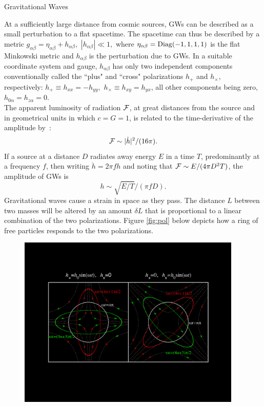 {Gravitational Waves}
{At a sufficiently large distance from cosmic sources, GWs 
can be described as a small perturbation to a flat spacetime. 
The spacetime can thus be described by a metric
$g_{\alpha\beta}=\eta_{\alpha\beta}+h_{\alpha\beta},$
$|h_{\alpha\beta}|\ll 1,$ where $\eta_{\alpha\beta}={\rm Diag}(-1,1,1,1)$ 
is the flat Minkowski metric and $h_{\alpha\beta}$ is the perturbation 
due to GWs.  In a suitable coordinate system and gauge,
$h_{\alpha\beta}$ has only two independent components conventionally
called the ``plus" and ``cross" polarizations $h_+$ and $h_\times,$ 
respectively: $h_+\equiv h_{xx}=-h_{yy},$ $h_\times \equiv  h_{xy} = 
h_{yx} $, all other components being zero, $h_{0\alpha}=h_{z\alpha}=0.$ 
\\[5pt]
The apparent luminosity of radiation ${\cal F}$, at great distances 
from the source and in geometrical units in which $c=G=1$, is related to the 
time-derivative of the amplitude 
by~\cite{schutz.2009}:
%
\begin{equation}\label{eq:flux}
{\cal F} \sim {| \dot h |^2}/{(16 \pi)}.
\end{equation}
%
If a source at a distance $D$ radiates away energy $E$ in a time $T$, 
predominantly at a frequency $f$, then writing $\dot h= 2\pi f h$ and 
noting that ${\cal F}\sim E/(4\pi D^2T)$, the amplitude of GWs is
%
\begin{equation} \label {eq:amplitude}
h \sim \sqrt{E/T}/(\pi f D) .
\end{equation}
%
Gravitational waves cause a strain in space as they pass. The distance
$L$ between two masses will be altered by an amount $\delta L$ that
is proportional to a linear combination of the two polarizations. 
Figure \ref{fig:pol} below depicts how a ring of free particles responds to
the two polarizations. 
\begin{figure}[H]
\centering
\includegraphics[width=0.95\textwidth]{./Sec_ET_ScienceCase/polarization.pdf}

\end{figure}}
